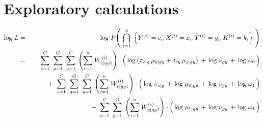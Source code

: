 

\section{Exploratory calculations}
\setcounter{theorem}{0}
\setcounter{equation}{0}

\renewcommand{\theenumi}{\roman{enumi}}
\renewcommand{\labelenumi}{\textnormal{(\theenumi)}$\;\;$}

\begin{eqnarray*}
\log\,L
	&=&
	\log\,P\!\left(\;
		\overset{n}{\underset{i=1}{\bigcap}}\;
		\left\{
			Y^{(i)}=c_{i},X^{(i)}=x_{i},\widetilde{Y}^{(i)}=y_{i},K^{(i)}=k_{i}
		\right\}
	\;\right)
\\
&=&
	{\color{white}+} \;\;
	\overset{C}{\underset{c=1}{\sum}}\;\;
	\overset{G}{\underset{g=1}{\sum}}\;\;
	\overset{C}{\underset{y=1}{\sum}}\;
	\left(\overset{n}{\underset{i=1}{\sum}}\;W^{(i)}_{c \vert gy{\color{red}0}}\right)
	\cdot
	\left(\,
		\log\left(\pi_{c \vert g}\,\mu_{0 \vert gy} + \delta_{cy}\,\mu_{1\vert gy}\right)
		\,\overset{{\color{white}.}}{+}\,
		\log\,\nu_{gy}
		\,\overset{{\color{white}.}}{+}\,
		\log\,\omega_{0}
	\,\right)
\\
&&
	+ \;\;
	\overset{C}{\underset{c=1}{\sum}}\;\;
	\overset{G}{\underset{g=1}{\sum}}\;\;
	\overset{C}{\underset{y=1}{\sum}}\;
	\left(\overset{n}{\underset{i=1}{\sum}}\;W^{(i)}_{c \vert gy{\color{red}1}}\right)
	\cdot
	\left(\,
		\log\,\pi_{c \vert g}
		\,\overset{{\color{white}.}}{+}\,
		\log\,\mu_{0\vert gy}
		\,\overset{{\color{white}.}}{+}\,
		\log\,\nu_{gy}
		\,\overset{{\color{white}.}}{+}\,
		\log\,\omega_{1}
	\,\right)
\\
&&
	+ \;\;
	\overset{C}{\underset{y=1}{\sum}}\;\;
	\overset{G}{\underset{g=1}{\sum}}\;
	\left(\overset{n}{\underset{i=1}{\sum}}\;W^{(i)}_{y \vert gy{\color{red}2}}\right)
	\cdot
	\left(\,
		\log\,\mu_{1 \vert gy}
		\,\overset{{\color{white}.}}{+}\,
		\log\,\nu_{gy}
		\,\overset{{\color{white}.}}{+}\,
		\log\,\omega_{1}
	\,\right)
\end{eqnarray*}


